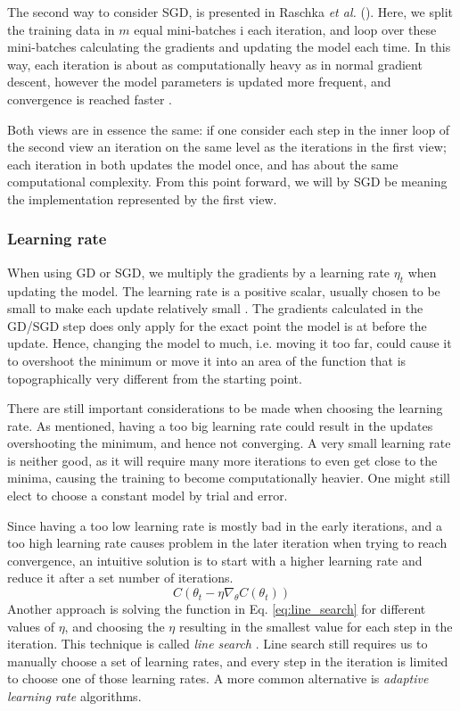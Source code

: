 The second way to consider SGD, is presented in Raschka \textit{et al.} (\citeyear[p. 47]{raschka}).
Here, we split the training data in $m$ equal mini-batches i each iteration, and loop over these mini-batches calculating the gradients and updating the model each time.
In this way, each iteration is about as computationally heavy as in normal gradient descent, however the model parameters is updated more frequent, and convergence is reached faster \citep[p. 47]{raschka}.

Both views are in essence the same: if one consider each step in the inner loop of the second view an iteration on the same level as the iterations in the first view; each iteration in both updates the model once, and has about the same computational complexity.
From this point forward, we will by SGD be meaning the implementation represented by the first view.

\subsubsection{Learning rate}
When using GD or SGD, we multiply the gradients by a learning rate $\eta_t$ when updating the model.
The learning rate is a positive scalar, usually chosen to be small to make each update relatively small \citep[p. 84]{Goodfellow-et-al-2016}.
The gradients calculated in the GD/SGD step does only apply for the exact point the model is at before the update.
Hence, changing the model to much, i.e. moving it too far, could cause it to overshoot the minimum or move it into an area of the function that is topographically very different from the starting point.

There are still important considerations to be made when choosing the learning rate.
As mentioned, having a too big learning rate could result in the updates overshooting the minimum, and hence not converging.
A very small learning rate is neither good, as it will require many more iterations to even get close to the minima, causing the training to become computationally heavier.
One might still elect to choose a constant model by trial and error.

Since having a too low learning rate is mostly bad in the early iterations, and a too high learning rate causes problem in the later iteration when trying to reach convergence, an intuitive solution is to start with a higher learning rate and reduce it after a set number of iterations.
\begin{equation}\label{eq:line_search}
    C(\theta_t - \eta \nabla_\theta C(\theta_t))
\end{equation}
Another approach is solving the function in Eq. \ref{eq:line_search} for different values of $\eta$, and choosing the $\eta$ resulting in the smallest value for each step in the iteration. This technique is called \textit{line search} \citep[p. 84]{Goodfellow-et-al-2016}.
Line search still requires us to manually choose a set of learning rates, and every step in the iteration is limited to choose one of those learning rates.
A more common alternative is \textit{adaptive learning rate} algorithms.

